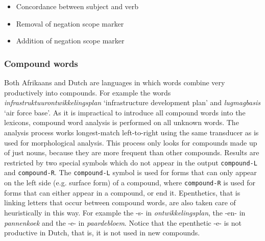 \documentclass[11pt]{article}
\begin{document}
\begin{itemize}
\item Concordance between subject and verb
\item Removal of negation scope marker
\end{itemize}

\begin{itemize}
\item Addition of negation scope marker
\end{itemize}


\subsubsection{Compound words}


Both Afrikaans and Dutch are languages in which words combine very
productively into compounds. For example the words {\em infrastruktuurontwikkelingsplan}
`infrastructure development plan' and {\em lugmagbasis}
`air force base'. As it is impractical to introduce
all compound words into the lexicons, compound word analysis is performed on
all unknown words. The analysis process works longest-match left-to-right
using the same transducer as is used for morphological analysis. This process only
looks for compounds made up of just nouns, because they are more frequent than other compounds.
Results are restricted by two special
symbols which do not appear in the output {\small {\tt compound-L}} and {\small {\tt compound-R}}.
The {\small {\tt compound-L}} symbol is used for forms that can only appear on the
left side (e.g. surface form) of a compound, where {\small {\tt compound-R}} is
used for forms that can either appear in a compound, or end it.
Epenthetics, that is linking letters that occur between compound words,
are also taken care of heuristically in this way. For example the -s-
in \emph{ontwikkelingsplan}, the -en- in \emph{pannenkoek} and the -e- in \emph{paardebloem}.
Notice that the epenthetic -e- is not productive in Dutch, that is, it is not used 
in new compounds.

%
%
%
\end{document}
